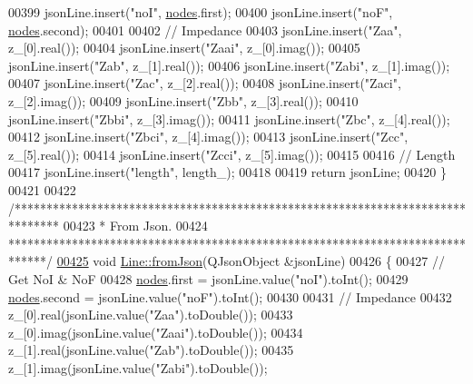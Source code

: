\begin{DoxyCode}
00399   jsonLine.insert(\textcolor{stringliteral}{"noI"}, \hyperlink{class_line_afd17c40d656e6a8d677cb22df5f0c70b}{nodes}.first);
00400   jsonLine.insert(\textcolor{stringliteral}{"noF"}, \hyperlink{class_line_afd17c40d656e6a8d677cb22df5f0c70b}{nodes}.second);
00401 
00402   \textcolor{comment}{// Impedance}
00403   jsonLine.insert(\textcolor{stringliteral}{"Zaa"}, z\_[0].real());
00404   jsonLine.insert(\textcolor{stringliteral}{"Zaai"}, z\_[0].imag());
00405   jsonLine.insert(\textcolor{stringliteral}{"Zab"}, z\_[1].real());
00406   jsonLine.insert(\textcolor{stringliteral}{"Zabi"}, z\_[1].imag());
00407   jsonLine.insert(\textcolor{stringliteral}{"Zac"}, z\_[2].real());
00408   jsonLine.insert(\textcolor{stringliteral}{"Zaci"}, z\_[2].imag());
00409   jsonLine.insert(\textcolor{stringliteral}{"Zbb"}, z\_[3].real());
00410   jsonLine.insert(\textcolor{stringliteral}{"Zbbi"}, z\_[3].imag());
00411   jsonLine.insert(\textcolor{stringliteral}{"Zbc"}, z\_[4].real());
00412   jsonLine.insert(\textcolor{stringliteral}{"Zbci"}, z\_[4].imag());
00413   jsonLine.insert(\textcolor{stringliteral}{"Zcc"}, z\_[5].real());
00414   jsonLine.insert(\textcolor{stringliteral}{"Zcci"}, z\_[5].imag());
00415 
00416   \textcolor{comment}{// Length}
00417   jsonLine.insert(\textcolor{stringliteral}{"length"}, length\_);
00418 
00419   \textcolor{keywordflow}{return} jsonLine;
00420 \}
00421 
00422 \textcolor{comment}{/*******************************************************************************}
00423 \textcolor{comment}{ * From Json.}
00424 \textcolor{comment}{ ******************************************************************************/}
\hypertarget{line_8cpp_source_l00425}{}\hyperlink{group___models_ga62623ad71df5279377cc69da90decc75}{00425} \textcolor{keywordtype}{void} \hyperlink{group___models_ga62623ad71df5279377cc69da90decc75}{Line::fromJson}(QJsonObject &jsonLine)
00426 \{
00427   \textcolor{comment}{// Get NoI & NoF}
00428   \hyperlink{class_line_afd17c40d656e6a8d677cb22df5f0c70b}{nodes}.first = jsonLine.value(\textcolor{stringliteral}{"noI"}).toInt();
00429   \hyperlink{class_line_afd17c40d656e6a8d677cb22df5f0c70b}{nodes}.second = jsonLine.value(\textcolor{stringliteral}{"noF"}).toInt();
00430 
00431   \textcolor{comment}{// Impedance}
00432   z\_[0].real(jsonLine.value(\textcolor{stringliteral}{"Zaa"}).toDouble());
00433   z\_[0].imag(jsonLine.value(\textcolor{stringliteral}{"Zaai"}).toDouble());
00434   z\_[1].real(jsonLine.value(\textcolor{stringliteral}{"Zab"}).toDouble());
00435   z\_[1].imag(jsonLine.value(\textcolor{stringliteral}{"Zabi"}).toDouble());

\end{DoxyCode}

